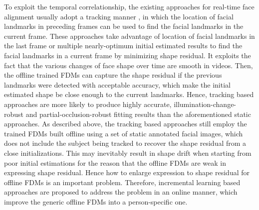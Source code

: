 \documentclass[a4paper, 10pt, conference]{ieeeconf}      %
\begin{document}
To exploit the temporal correlationship, the existing approaches for real-time face alignment usually adopt a tracking manner 
\cite{vogler2007best,wettum2017facial}, in which
the location of facial landmarks in preceding frames can be used to find the facial landmarks in the current frame.
These approaches take advantage of location of facial landmarks in the last frame or multiple nearly-optimum initial estimated results to
find the facial landmarks in a current frame by minimizing shape residual. It exploits the fact that the various changes of face shape over time
are smooth in videos. Then, the offline trained FDMs can capture the shape residual if the previous landmarks were detected with acceptable accuracy,
which make the initial estimated shape be close enough to the current landmarks. Hence, tracking based approaches are more likely to produce highly
accurate, illumination-change-robust and partial-occlusion-robust fitting results than the aforementioned static approaches.
As described above, the tracking based approaches still employ the trained FDMs 
built offline using a set of static annotated facial images, which does not include the subject being tracked \cite{sanchez2016cascaded}
to recover the shape residual from a close initializations. This may inevitably result in shape drift when starting from poor initial estimations
for the reason that the offline FDMs are weak in expressing shape residual. Hence how to enlarge expression to shape residual for offline FDMs
is an important problem. Therefore, incremental learning based approaches
\cite{sanchez2016cascaded,peng2016sequential,sung2009adaptive,asthana2014incremental,peng2015piefa}
are proposed to address the problem in an online manner, which improve the generic offline FDMs into a person-specific one.
\end{document}
